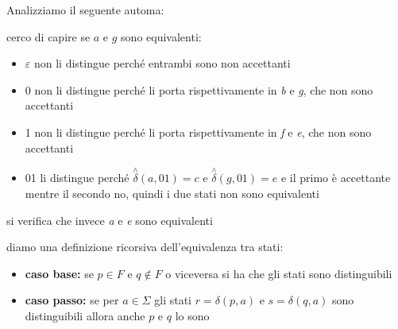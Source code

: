 \documentclass[a4paper,12pt, oneside]{book}
\begin{document}
\begin{esempio}
Analizziamo il seguente automa:
\begin{center}
\end{center}
cerco di capire se $a$ e $g$ sono equivalenti:
\begin{itemize}
\item $\varepsilon$ non li distingue perché entrambi sono non accettanti
\item 0 non li distingue perché li porta rispettivamente in \textit{b} e \textit{g}, che non sono accettanti
\item 1 non li distingue perché li porta rispettivamente in \textit{f} e \textit{e}, che non sono accettanti
\item 01 li distingue perché $\stackrel{\wedge}{\delta}(a,01)=c$ e $\stackrel{\wedge}{\delta}(g,01)=e$ e il primo è accettante mentre il secondo no, quindi i due stati non sono equivalenti
\end{itemize}
si verifica che invece \textit{a} e \textit{e} sono equivalenti
\end{esempio}
diamo una definizione ricorsiva dell'equivalenza tra stati:
\begin{itemize}
\item \textbf{caso base:} se $p\in F$ e $q\not\in F$ o viceversa si ha che gli stati sono distinguibili
\item \textbf{caso passo:} se per $a\in \Sigma$ gli stati $r=\delta(p,a)$ e $s=\delta(q,a)$ sono distinguibili allora anche $p$ e $q$ lo sono
\end{itemize}
\end{document}
